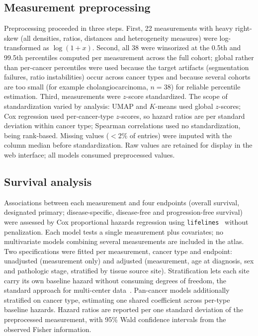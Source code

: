 \subsection{Measurement preprocessing}
\label{sec:methods:preprocessing}

Preprocessing proceeded in three steps. First, 22 measurements with heavy
right-skew (all densities, ratios, distances and heterogeneity measures) were
log-transformed as $\log(1 + x)$. Second, all 38 were winsorized at the 0.5th and
99.5th percentiles computed per measurement across the full cohort; global rather
than per-cancer percentiles were used because the target artifacts (segmentation
failures, ratio instabilities) occur across cancer types and because several
cohorts are too small (for example cholangiocarcinoma, $n = 38$) for reliable
percentile estimation. Third, measurements were $z$-score standardized. The scope
of standardization varied by analysis: UMAP and $K$-means used global $z$-scores;
Cox regression used per-cancer-type $z$-scores, so hazard ratios are per standard
deviation within cancer type; Spearman correlations used no standardization,
being rank-based. Missing values ($<$2\% of entries) were imputed with the
column median before standardization. Raw values are retained for display in the
web interface; all models consumed preprocessed values.

\subsection{Survival analysis}
\label{sec:methods:survival}

Associations between each measurement and four endpoints (overall survival,
designated primary; disease-specific, disease-free and progression-free survival)
were assessed by Cox proportional hazards regression using
\texttt{lifelines}~\cite{davidsonpilon2019} without penalization. Each model
tests a single measurement plus covariates; no multivariate models combining
several measurements are included in the atlas. Two specifications were fitted
per measurement, cancer type and endpoint: unadjusted (measurement only) and
adjusted (measurement, age at diagnosis, sex and pathologic stage, stratified by
tissue source site). Stratification lets each site carry its own baseline hazard
without consuming degrees of freedom, the standard approach for multi-center
data~\cite{therneau2000modeling}. Pan-cancer models additionally stratified on
cancer type, estimating one shared coefficient across per-type baseline hazards.
Hazard ratios are reported per one standard deviation of the preprocessed
measurement, with 95\% Wald confidence intervals from the observed Fisher
information.


